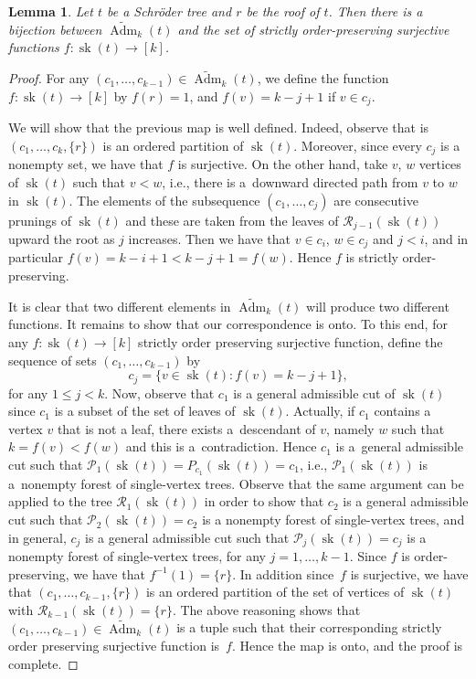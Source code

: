 \documentclass[pdftex]{sigma}%
\numberwithin{equation}{section}
\newtheorem{Lemma}[Theorem]{Lemma}
\newcommand{\cR}{\mathcal{R}}
\newcommand{\ccP}{\mathcal{P}}
\newcommand{\sk}{\operatorname{sk}}
\newcommand{\AdmT}{\widetilde{\operatorname{Adm}}}
\begin{document}
\begin{Lemma}\label{lemma:bijection}Let $t$ be a Schr\"oder tree and $r$ be the roof of $t$. Then there is a bijection between $\AdmT_k(t)$ and the set of strictly order-preserving surjective functions $f\colon \sk(t)\to [k]$.
\end{Lemma}
\begin{proof}For any $(c_1,\dots,c_{k-1})\in \AdmT_k(t)$, we define the function $f\colon \sk(t)\to[k]$ by $f(r) = 1$, and $f(v) = k - j+1$ if $v\in c_{j}$.

We will show that the previous map is well defined. Indeed, observe that is $(c_1,\dots,c_k,\{r\})$ is an ordered partition of $\sk(t)$. Moreover, since every $c_j$ is a nonempty set, we have that $f$ is surjective. On the other hand, take $v$, $w$ vertices of $\sk(t)$ such that $v<w$, i.e., there is a~downward directed path from $v$ to $w$ in $\sk(t)$. The elements of the subsequence $(c_1,\dots,c_j)$ are consecutive prunings of $\sk(t)$ and these are taken from the leaves of $\cR_{j-1}(\sk(t))$ upward the root as $j$ increases. Then we have that $v\in c_i$, $w\in c_j$ and $j<i$, and in particular $f(v) = k-i+1 < k-j+1 = f(w)$. Hence $f$ is strictly order-preserving.

 It is clear that two different elements in $\AdmT_k(t)$ will produce two different functions. It remains to show that our correspondence is onto. To this end, for any $f\colon \sk(t)\to[k]$ strictly order preserving surjective function, define the sequence of sets $(c_1,\dots,c_{k-1})$ by
 \[
 c_j = \{ v\in \sk(t)\colon f(v) = k-j+1\},
 \]
 for any $1\leq j<k$. Now, observe that $c_1$ is a general admissible cut of $\sk(t)$ since $c_1$ is a subset of the set of leaves of $\sk(t)$. Actually, if $c_1$ contains a vertex $v$ that is not a leaf, there exists a~descendant of $v$, namely $w$ such that $k = f(v) < f(w)$ and this is a~contradiction. Hence $c_1$ is a~general admissible cut such that $\ccP_1(\sk(t)) = P_{c_1}(\sk(t)) = c_1$, i.e., $\ccP_{1}(\sk(t))$ is a~nonempty forest of single-vertex trees. Observe that the same argument can be applied to the tree $\cR_1(\sk(t))$ in order to show that $c_2$ is a general admissible cut such that $\ccP_{2}(\sk(t)) = c_2$ is a nonempty forest of single-vertex trees, and in general, $c_j$ is a general admissible cut such that $\ccP_j(\sk(t))= c_j$ is a nonempty forest of single-vertex trees, for any $j=1,\dots,k-1$. Since $f$ is order-preserving, we have that $f^{-1}(1) = \{r\}$. In addition since~$f$ is surjective, we have that $(c_1,\dots,c_{k-1},\{r\})$ is an ordered partition of the set of vertices of $\sk(t)$ with $\cR_{k-1}(\sk(t)) = \{r\}$. The above reasoning shows that $(c_1,\dots,c_{k-1})\in \AdmT_k(t)$ is a tuple such that their corresponding strictly order preserving surjective function is~$f$. Hence the map is onto, and the proof is complete.
\end{proof}
\end{document}
